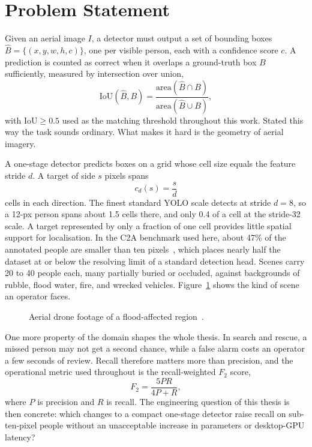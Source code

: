 \section{Problem Statement}
Given an aerial image $I$, a detector must output a set of bounding boxes
$\hat{B} = \{(x, y, w, h, c)\}$, one per visible person, each with a confidence
score $c$. A prediction is counted as correct when it overlaps a ground-truth
box $B$ sufficiently, measured by intersection over union,
\begin{equation}
  \mathrm{IoU}(\hat{B}, B) =
    \frac{\mathrm{area}(\hat{B} \cap B)}{\mathrm{area}(\hat{B} \cup B)},
  \label{eq:iou}
\end{equation}
with $\mathrm{IoU} \geq 0.5$ used as the matching threshold throughout this
work. Stated this way the task sounds ordinary. What makes it hard is the
geometry of aerial imagery.

A one-stage detector predicts boxes on a grid whose cell size equals the
feature stride $d$. A target of side $s$ pixels spans
\begin{equation}
  c_d(s) = \frac{s}{d}
  \label{eq:coverage}
\end{equation}
cells in each direction. The finest standard YOLO scale detects at stride
$d = 8$, so a 12-px person spans about 1.5 cells there, and only 0.4 of a cell
at the stride-32 scale. A target represented by only a fraction of one cell
provides little spatial support for localisation. In the C2A benchmark used here, about 47\% of the
annotated people are smaller than ten pixels~\cite{nihal2024c2a}, which places
nearly half the dataset at or below the resolving limit of a standard
detection head. Scenes carry 20 to 40 people each, many partially buried or
occluded, against backgrounds of rubble, flood water, fire, and wrecked
vehicles. Figure~\ref{fig:introscene} shows the kind of scene an operator
faces.

\begin{figure}[tbp]
  \centering
  \caption{Aerial drone footage of a flood-affected region~\cite{agiindia2024drones}.}
  \label{fig:introscene}
\end{figure}

One more property of the domain shapes the whole thesis. In search and rescue,
a missed person may not get a second chance, while a false alarm costs an
operator a few seconds of review. Recall therefore matters more than
precision, and the operational metric used throughout is the recall-weighted
$F_2$ score,
\begin{equation}
  F_2 = \frac{5PR}{4P + R},
  \label{eq:f2}
\end{equation}
where $P$ is precision and $R$ is recall. The engineering question of this
thesis is then concrete: which changes to a compact one-stage detector raise
recall on sub-ten-pixel people without an unacceptable increase in parameters
or desktop-GPU latency?

